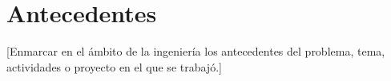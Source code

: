 \documentclass[12pt]{caltech_thesis}
\begin{document}








\chapter{Antecedentes}

[Enmarcar en el ámbito de la ingeniería los antecedentes del problema, tema, actividades o proyecto en el que se trabajó.]
\end{document}
